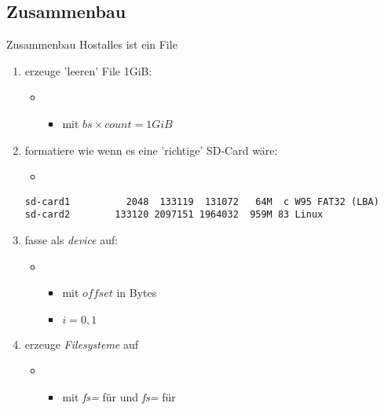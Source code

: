 \subsection{Zusammenbau}
\begin{frame}[fragile]{Zusammenbau Host}{alles ist ein File}
\begin{enumerate}
 \item erzeuge 'leeren' File  1GiB:
 \begin{itemize}
  \item {\footnotesize{}}
  \begin{itemize}
   \item mit $bs\times count = 1GiB$  
  \end{itemize}
 \end{itemize}
 \item formatiere  wie wenn es eine 'richtige' SD-Card wäre:
 \begin{itemize}
  \item {}
 \end{itemize}
{\tiny
\begin{verbatim} 
sd-card1          2048  133119  131072   64M  c W95 FAT32 (LBA)
sd-card2        133120 2097151 1964032  959M 83 Linux
\end{verbatim}
}
 \item fasse  als {\em device} auf:
 \begin{itemize}
  \item {}
  \begin{itemize}
   \item mit $offset$ in Bytes
   \item $i=0,1$
  \end{itemize}
 \end{itemize}
 \item erzeuge {\em Filesysteme} auf  
 \begin{itemize}
  \item {}
  \begin{itemize}
   \item mit {\em fs=} für  und {\em fs=} für
  \end{itemize}
 \end{itemize}
\end{enumerate}
\end{frame}

